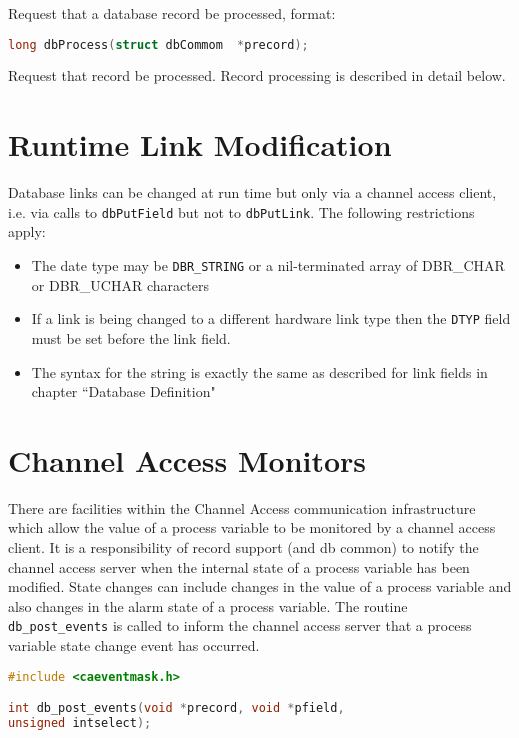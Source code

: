 Request that a database record be processed, format:

\begin{lstlisting}[language=C]
long dbProcess(struct dbCommom  *precord);
\end{lstlisting}

Request that record be processed.
Record processing is described in detail below.

\section{Runtime Link Modification}

Database links can be changed at run time but only via a channel access client, i.e. via calls to \verb|dbPutField| but not to \verb|dbPutLink|.
The following restrictions apply:

\begin{itemize}
\item The date type may be \verb|DBR_STRING| or a nil-terminated array of DBR\_CHAR or DBR\_UCHAR characters

\item If a link is being changed to a different hardware link type then the \verb|DTYP| field must be set before the link field.

\item The syntax for the string is exactly the same as described for link fields in chapter ``Database Definition"

\end{itemize}

\section{Channel Access Monitors}

There are facilities within the Channel Access communication infrastructure which allow the value of a process variable to be monitored by a channel access client.
It is a responsibility of record support (and db common) to notify the channel access server when the internal state of a process variable has been modified.
State changes can include changes in the value of a process variable and also changes in the alarm state of a process variable.
The routine \verb|db_post_events| is called to inform the channel access server that a process variable state change event has occurred.

\begin{lstlisting}[language=C]
#include <caeventmask.h>

int db_post_events(void *precord, void *pfield,
unsigned intselect);
\end{lstlisting}

